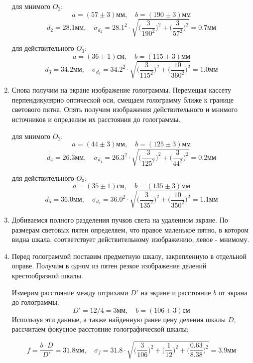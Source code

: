 \documentclass[a4paper,12pt]{article}
\begin{document}
\begin{enumerate}
    для мнимого $O_2$:
    $$
    a=(57\pm3)\text{мм}, \quad b=(190\pm3)\text{мм}
    $$
    $$
    d_2=28.1\text{мм}, \quad \sigma_{d_2}=28.1^2\cdot\sqrt{\Big(\frac{3}{190^2}\Big)^2+\Big(\frac{3}{57^2}\Big)^2}=0.7\text{мм}
    $$

    для действительного $O_3$:
    $$
    a=(36\pm1)\text{см}, \quad b=(115\pm3)\text{мм}
    $$
    $$
    d_3=34.2\text{мм}, \quad \sigma_{d_3}=34.2^2\cdot\sqrt{\Big(\frac{3}{115^2}\Big)^2+\Big(\frac{10}{360^2}\Big)^2}=1.0\text{мм}
    $$

    \item Снова получим на экране изображение голограммы. Перемещая кассету перпендикулярно оптической оси, смещаем голограмму ближе к границе светового пятна. Опять получим изображения действительного и мнимого источников и определим их расстояния до голограммы.

    для мнимого $O_2$:
    $$
    a=(44\pm3)\text{мм}, \quad b=(125\pm3)\text{мм}
    $$
    $$
    d_4=26.3\text{мм}, \quad \sigma_{d_4}=26.3^2\cdot\sqrt{\Big(\frac{3}{125^2}\Big)^2+\Big(\frac{3}{44^2}\Big)^2}=0.2\text{мм}
    $$

    для действительного $O_3$:
    $$
    a=(35\pm1)\text{см}, \quad b=(135\pm3)\text{мм}
    $$ 
    $$
    d_5=36.0\text{мм}, \quad \sigma_{d_5}=36.0^2\cdot\sqrt{\Big(\frac{3}{135^2}\Big)^2+\Big(\frac{10}{350^2}\Big)^2}=1.1\text{мм}
    $$

    \item Добиваемся полного разделения пучков света на удаленном экране. По размерам световых пятен определяем, что правое маленькое пятно, в котором видна шкала, соответствует действительному изображению, левое - мнимому.
    \item Перед голограммой поставим предметную шкалу, закрепленную в отдельной оправе. Получим в одном из пятен резкое изображение делений крестообразной шкалы. 
    
    Измерим расстояние между штрихами $D'$ на экране и расстояние $b$ от экрана до голограммы:
    $$
    D'=12/4=3\text{мм}, \quad b=(106\pm 3)\text{см}
    $$
    Используя эти данные, а также найденную ранее цену деления шкалы $D$, рассчитаем фокусное расстояние голографической шкалы:
    
    $$
    f=\frac{b\cdot D}{D'}=31.8\text{мм}, \quad \sigma_f=31.8\cdot\sqrt{\Big(\frac{3}{106}\Big)^2+\Big(\frac{1}{12}\Big)^2+\Big(\frac{0.63}{8.38}\Big)^2}=3.9\text{мм}
    $$
    
\end{enumerate}
\end{document}
